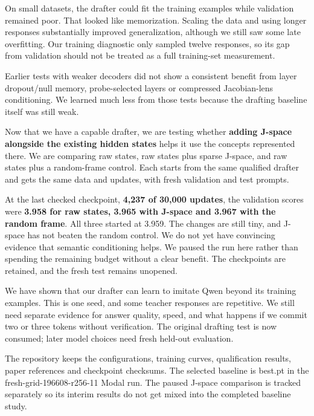 \documentclass[11pt,a4paper]{article}
\begin{document}
\vspace{2mm}{\large\bfseries What did not help\par}

On small datasets, the drafter could fit the training examples while validation remained poor. That looked like memorization. Scaling the data and using longer responses substantially improved generalization, although we still saw some late overfitting. Our training diagnostic only sampled twelve responses, so its gap from validation should not be treated as a full training-set measurement.

Earlier tests with weaker decoders did not show a consistent benefit from layer dropout/null memory, probe-selected layers or compressed Jacobian-lens conditioning. We learned much less from those tests because the drafting baseline itself was still weak.

\vspace{2mm}{\large\bfseries The J-space question\par}

Now that we have a capable drafter, we are testing whether \textbf{adding J-space alongside the existing hidden states} helps it use the concepts represented there. We are comparing raw states, raw states plus sparse J-space, and raw states plus a random-frame control. Each starts from the same qualified drafter and gets the same data and updates, with fresh validation and test prompts.

At the last checked checkpoint, \textbf{4,237 of 30,000 updates}, the validation scores were \textbf{3.958 for raw states, 3.965 with J-space and 3.967 with the random frame}. All three started at 3.959. The changes are still tiny, and J-space has not beaten the random control. We do not yet have convincing evidence that semantic conditioning helps. We paused the run here rather than spending the remaining budget without a clear benefit. The checkpoints are retained, and the fresh test remains unopened.

\vspace{2mm}{\large\bfseries What this tells us\par}

We have shown that our drafter can learn to imitate Qwen beyond its training examples. This is one seed, and some teacher responses are repetitive. We still need separate evidence for answer quality, speed, and what happens if we commit two or three tokens without verification. The original drafting test is now consumed; later model choices need fresh held-out evaluation.

The repository keeps the configurations, training curves, qualification results, paper references and checkpoint checksums. The selected baseline is best.pt in the fresh-grid-196608-r256-11 Modal run. The paused J-space comparison is tracked separately so its interim results do not get mixed into the completed baseline study.
\end{document}
